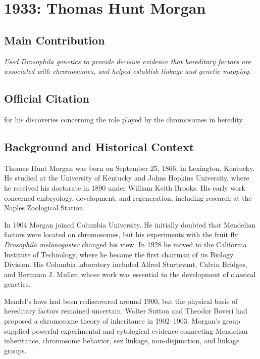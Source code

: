 \chapter[1933 --- Morgan]{1933: Thomas Hunt Morgan}
\label{ch:1933_thomashuntmorgan}

\section*{Main Contribution}

\textit{Used \emph{Drosophila} genetics to provide decisive evidence that hereditary factors are associated with chromosomes, and helped establish linkage and genetic mapping.}\cite{nobel-1933,lecture-1933}

\section{Official Citation}

for his discoveries concerning the role played by the chromosomes in heredity\cite{nobel-1933}

\section{Background and Historical Context}

Thomas Hunt Morgan was born on September 25, 1866, in Lexington, Kentucky. He studied at the University of Kentucky and Johns Hopkins University, where he received his doctorate in 1890 under William Keith Brooks. His early work concerned embryology, development, and regeneration, including research at the Naples Zoological Station.

In 1904 Morgan joined Columbia University. He initially doubted that Mendelian factors were located on chromosomes, but his experiments with the fruit fly \emph{Drosophila melanogaster} changed his view. In 1928 he moved to the California Institute of Technology, where he became the first chairman of its Biology Division. His Columbia laboratory included Alfred Sturtevant, Calvin Bridges, and Hermann J. Muller, whose work was essential to the development of classical genetics.

Mendel's laws had been rediscovered around 1900, but the physical basis of hereditary factors remained uncertain. Walter Sutton and Theodor Boveri had proposed a chromosome theory of inheritance in 1902--1903. Morgan's group supplied powerful experimental and cytological evidence connecting Mendelian inheritance, chromosome behavior, sex linkage, non-disjunction, and linkage groups.


